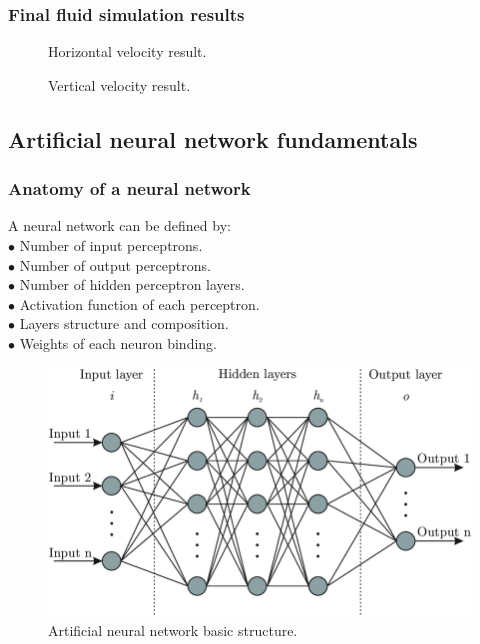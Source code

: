 \documentclass[xcolor=dvipsnames,10pt,aspectratio=169]{beamer}
\begin{document}
\begin{frame}
	\frametitle{Final fluid simulation results}
	\begin{minipage}[h!]{0.45\textwidth}
	\begin{figure}
	 	\caption{Horizontal velocity result.}
	\end{figure}
	\end{minipage}
	\begin{minipage}[h!]{0.45\textwidth}
	\begin{figure}
	 	\caption{Vertical velocity result.}
	\end{figure}
	\end{minipage}
\end{frame}

\subsection{Artificial neural network fundamentals}

\begin{frame}
	\frametitle{Anatomy of a neural network}
	\begin{minipage}[h!]{0.45\textwidth}
		A neural network can be defined by:\\
		$\bullet$ Number of input perceptrons.\\
		$\bullet$ Number of output perceptrons.\\
		$\bullet$ Number of hidden perceptron layers.\\
		$\bullet$ Activation function of each perceptron.\\
		$\bullet$ Layers structure and composition.\\
		$\bullet$ Weights of each neuron binding.\\
	\end{minipage}
	\begin{minipage}[h!]{0.45\textwidth}
	\begin{figure}[h!]
		\centering
		\includegraphics[trim = {0cm 0cm 0cm 0cm}, clip , angle=0, scale=0.26]{./figuras/ann_structure.png}
		\caption{Artificial neural network basic structure.}
	\end{figure}
	\end{minipage}
\end{frame}
\end{document}
